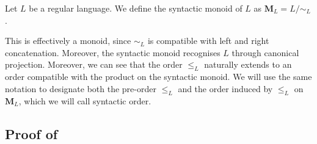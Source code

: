 \documentclass[a4paper,UKenglish,cleveref, autoref, thm-restate]{lipics-v2021}
\newcommand{\M}{\mathbf{M}}
\begin{document}
\begin{definition}
    Let $L$ be a regular language. We define the syntactic monoid of $L$ as $\M_L = L/\sim_L$.
\end{definition}



\begin{remark}
    This is effectively a monoid, since $\sim_L$ is compatible with left and right concatenation. Moreover, the syntactic monoid recognises $L$ through canonical projection. Moreover, we can see that the order $\leq_L$ naturally extends to an order compatible with the product on the syntactic monoid. We will use the same notation to designate both the pre-order $\leq_L$ and the order induced by $\leq_L$ on $\M_L$, which we will call syntactic order.
\end{remark}







\subsection{\texorpdfstring{Proof of }{Proof of Lemma 29}} \label{ap:proofordrmono}
\end{document}
